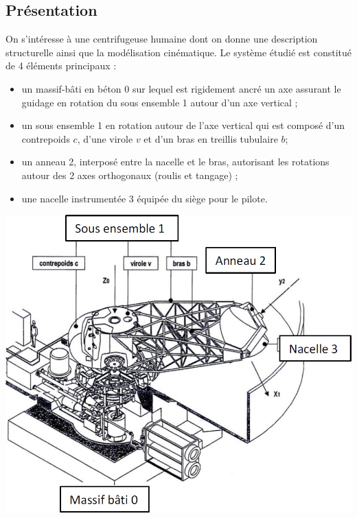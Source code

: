 \documentclass[10pt,fleqn]{article} %
\begin{document}
\def\pathfig{images}

\vspace{4.5cm}
\pagestyle{fancy}
\thispagestyle{plain}

\def\columnseprulecolor{\color{ocre}}
\setlength{\columnseprule}{0.4pt} 

\def\pathfig{images}

\begin{multicols}{2}

\subsection*{Présentation}

On s’intéresse à une centrifugeuse humaine dont on donne une description structurelle ainsi que la
modélisation cinématique.
Le système étudié est constitué de 4 éléments principaux :
\begin{itemize}
\item un massif-bâti en béton 0 sur lequel est rigidement ancré un axe assurant le guidage en rotation du sous ensemble 1
autour d’un axe vertical ;
\item un sous ensemble 1 en rotation autour de l’axe vertical qui est composé d’un contrepoids $c$, d’une virole $v$ et d’un bras en treillis tubulaire $b$;
\item un anneau 2, interposé entre la nacelle et le bras, autorisant les rotations autour des 2 axes orthogonaux (roulis et tangage) ;
\item une nacelle instrumentée 3 équipée du siège pour le pilote.
\end{itemize}

\begin{center}
\includegraphics[width=\linewidth]{images/fig_01.png}
\end{center}


\end{multicols}
\end{document}
